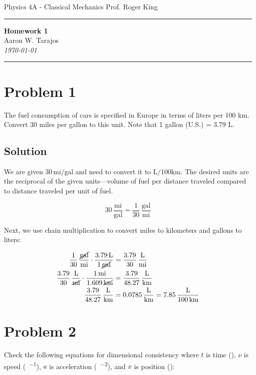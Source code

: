 \documentclass{article}
\newcommand{\mile}{\text{mi}}
\newcommand{\gallon}{\text{gal}}
\newcommand{\kilo}{\text{k}}
\newcommand{\liter}{\text{L}}
\newcommand{\meter}{\text{m}}
\newcommand{\second}{\text{s}}
\begin{document}
\noindent
Physics 4A - Classical Mechanics \hfill Prof. Roger King

\noindent\rule{\textwidth}{0.4pt}

\begin{center}
    \textbf{\LARGE Homework 1} \\
    \vspace{12pt}
    \large Aaron W. Tarajos \\
    \textit{\today}
\end{center}

\noindent\rule{\textwidth}{0.4pt}

\section*{Problem 1}
The fuel consumption of cars is specified in Europe in terms of liters per 100 km. Convert
30 miles per gallon to this unit. Note that 1 gallon (U.S.) = 3.79 L.

\subsection*{Solution}
We are given \(30 \, \si{\mile\per\gallon}\) and need to convert it to \(\si{\liter\per100\kilo\meter}\). The desired units are the reciprocal of the given units—volume of fuel per distance traveled compared to distance traveled per unit of fuel.

\[
30 \, \frac{\mile}{\gallon} = \frac{1}{30} \, \frac{\gallon}{\mile}
\]

Next, we use chain multiplication to convert miles to kilometers and gallons to liters:

\begin{align*}
\frac{1}{30} \, \frac{\cancel{\gallon}}{\mile} \cdot \frac{3.79 \, \liter}{1 \, \cancel{\gallon}} &= \frac{3.79}{30} \, \frac{\liter}{\mile} \\
\frac{3.79}{30} \, \frac{\liter}{\cancel{\mile}} \cdot \frac{1 \, \mile}{1.609 \, \cancel{\kilo\meter}} &= \frac{3.79}{48.27} \, \frac{\liter}{\kilo\meter} \\
\frac{3.79}{48.27} \, \frac{\liter}{\kilo\meter} &= 0.0785 \, \frac{\liter}{\kilo\meter} = 7.85 \, \frac{\liter}{100 \, \kilo\meter}
\end{align*}

\section*{Problem 2}
Check the following equations for dimensional consistency where \( t \) is time (\si{\second}), \( \nu \) is speed (\si{\meter\per\second}), \( a \) is acceleration (\si{\meter\per\second^2}), and \( x \) is position (\si{\meter}):
\end{document}
